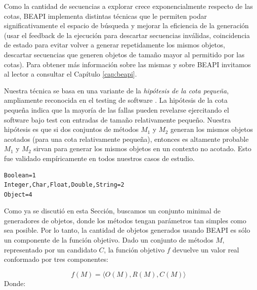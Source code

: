 Como la cantidad de secuencias a explorar crece exponencialmente respecto de las cotas, BEAPI implementa distintas técnicas que le permiten podar significativamente el espacio de búsqueda y mejorar la eficiencia de la generación (usar el feedback de la ejecución para descartar secuencias inválidas, coincidencia de estado para evitar volver a generar repetidamente los mismos objetos, descartar secuencias que generen objetos de tamaño mayor al permitido por las cotas). Para obtener más información sobre las mismas y sobre BEAPI invitamos al lector a consultar el Capítulo \ref{cap:beapi}.

Nuestra técnica se basa en una variante de la \emph{hipótesis de la cota pequeña}, ampliamente reconocida en el testing de software \cite{Andoni:2003,jackson2006, Abad13}. La hipótesis de la cota pequeña indica que la mayoría de las fallas pueden revelarse ejercitando el software bajo test con entradas de tamaño relativamente pequeño. Nuestra hipótesis es que si dos conjuntos de métodos $M_1$ y $M_2$ generan los mismos objetos acotados (para una cota relativamente pequeña), entonces es altamente probable $M_1$ y $M_2$ sirvan para generar los mismos objetos en un contexto no acotado. Esto fue validado empíricamente en todos nuestros casos de estudio.


\begin{lstlisting}[label=fig:rankParameters,caption=Ranking con los tipos de parametros, captionpos=b,frame=tb, float=t]
Boolean=1
Integer,Char,Float,Double,String=2
Object=4
\end{lstlisting}

Como ya se discutió en esta Sección, buscamos un conjunto minimal de generadores de objetos, donde los métodos tengan parámetros tan simples como sea posible. Por lo tanto, la cantidad de objetos generados usando BEAPI es sólo un componente de la función objetivo. Dado un conjunto de métodos $M$, representado por un candidato $C$, la función objetivo $f$ devuelve un valor real conformado por tres componentes:

\[
f(M) = \langle O(M), R(M), C(M) \rangle
\]
Donde:

